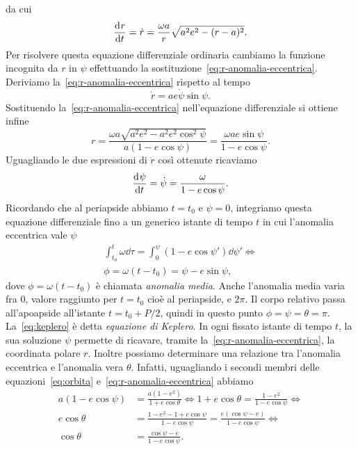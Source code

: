 da cui
\begin{equation}
  \frac{{\mathop{}\!\mathrm{d}^{}}r}{\mathop{}\!\mathrm{d} {t}^{}} = \dot{r} = \frac{\omega a}{r}\sqrt{a^2e^2 - (r-a)^2}.
\end{equation}
Per risolvere questa equazione differenziale ordinaria cambiamo la funzione
incognita da $r$ in $\psi$ effettuando la
sostituzione~\eqref{eq:r-anomalia-eccentrica}. Deriviamo
la~\eqref{eq:r-anomalia-eccentrica} rispetto al tempo
\begin{equation}
  \dot{r} = ae\dot{\psi}\sin\psi.
\end{equation}
Sostituendo la~\eqref{eq:r-anomalia-eccentrica} nell'equazione differenziale si
ottiene infine
\begin{equation}
  r = \frac{\omega a\sqrt{a^2e^2 - a^2e^2\cos^2\psi}}{a(1-e\cos\psi)} =
  \frac{\omega ae\sin\psi}{1-e\cos\psi}.
\end{equation}
Uguagliando le due espressioni di $\dot{r}$ così ottenute ricaviamo
\begin{equation}
  \frac{{\mathop{}\!\mathrm{d}^{}}\psi}{\mathop{}\!\mathrm{d} {t}^{}} = \dot{\psi} = \frac{\omega}{1-e\cos\psi}.
\end{equation}
Ricordando che al periapside abbiamo $t = t_0$ e $\psi = 0$, integriamo questa
equazione differenziale fino a un generico istante di tempo $t$ in cui
l'anomalia eccentrica vale $\psi$
\begin{gather}
  \int_{t_0}^t \omega\dd \tau = \int_0^\psi(1-e\cos\psi')\dd \psi' \iff\\
  \phi = \omega(t - t_0) = \psi - e\sin\psi, \label{eq:keplero}
\end{gather}
dove $\phi = \omega(t-t_0)$ è chiamata \emph{anomalia media}. Anche l'anomalia
media varia fra $0$, valore raggiunto per $t = t_0$ cioè al periapside, e
$2\pi$. Il corpo relativo passa all'apoapside all'istante $t = t_0 + P/2$,
quindi in questo punto $\phi = \psi = \theta = \pi$. La~\eqref{eq:keplero} è detta
\emph{equazione di Keplero}. In ogni fissato istante di tempo $t$, la sua
soluzione $\psi$ permette di ricavare, tramite
la~\eqref{eq:r-anomalia-eccentrica}, la coordinata polare $r$. Inoltre possiamo
determinare una relazione tra l'anomalia eccentrica e l'anomalia vera $\theta$.
Infatti, uguagliando i secondi membri delle equazioni~\eqref{eq:orbita}
e~\eqref{eq:r-anomalia-eccentrica} abbiamo
\begin{equation}
  \begin{aligned}
    a(1-e\cos\psi) &= \frac{a(1-e^2)}{1+e\cos\theta} \iff 1+e\cos\theta =
    \frac{1-e^2}{1-e\cos\psi} \iff \\
    e\cos\theta &= \frac{1-e^2-1+e\cos\psi}{1-e\cos\psi} =
    \frac{e(\cos\psi-e)}{1-e\cos\psi} \iff \\
    \cos\theta &= \frac{\cos\psi-e}{1-e\cos\psi}.
  \end{aligned}
\end{equation}
